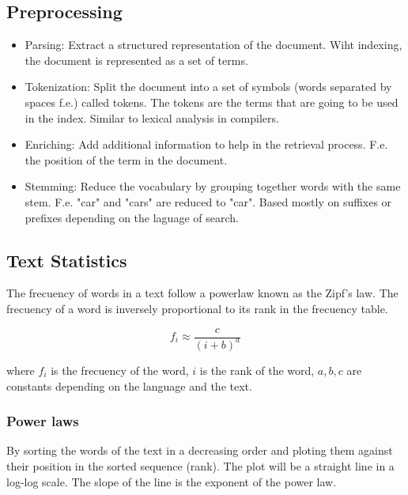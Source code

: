 \documentclass{article}
\begin{document}
    \subsection{Preprocessing}
    \begin{itemize}
        \item Parsing: Extract a structured representation of the document. Wiht indexing, the document is represented as a set of terms.
        \item Tokenization: Split the document into a set of symbols (words separated by spaces f.e.) called tokens. The tokens are the terms that are going to be used in the index.  Similar to lexical analysis in compilers.
        \item Enriching: Add additional information to help in the retrieval process. F.e. the position of the term in the document.
        \item Stemming: Reduce the vocabulary by grouping together words with the same stem. F.e. "car" and "cars" are reduced to "car". Based mostly on suffixes or prefixes depending on the laguage of search.
    \end{itemize}
        
        \subsection{Text Statistics}
        The frecuency of words in a text follow a powerlaw known as the Zipf's law. The frecuency of a word is inversely proportional to its rank in the frecuency table.

        \begin{equation}
            f_i \approx \frac{c}{(i+b)^a}
        \end{equation}

        where $f_i$ is the frecuency of the word, $i$ is the rank of the word, $a, b, c$ are constants depending on the language and the text.

        \subsubsection{Power laws}
        By sorting the words of the text in a decreasing order and ploting them against their position in the sorted sequence (rank). The plot will be a straight line in a log-log scale. The slope of the line is the exponent of the power law.
\end{document}
